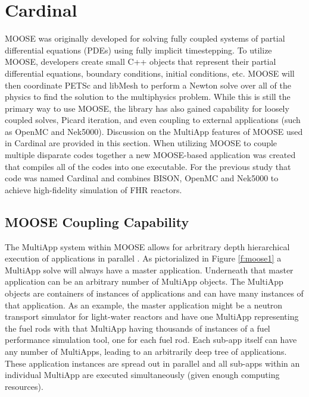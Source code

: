 \section{Cardinal}
\label{s:cardinal}

MOOSE was originally developed for solving fully coupled systems of partial differential equations (PDEs) using fully implicit timestepping. To utilize MOOSE, developers create small C++ objects that represent their partial differential equations, boundary conditions, initial conditions, etc. MOOSE will then coordinate PETSc and libMesh to perform a Newton solve over all of the physics to find the solution to the multiphysics problem. While this is still the primary way to use MOOSE, the library has also gained capability for loosely coupled solves, Picard iteration, and even coupling to external applications (such as OpenMC and Nek5000). Discussion on the MultiApp features of MOOSE used in Cardinal are provided in this section. When utilizing MOOSE to couple multiple disparate codes together a new MOOSE-based application was created \cite{cardinal}  that compiles all of the codes into one executable. For the previous study that code was  named Cardinal and combines BISON, OpenMC and Nek5000 to achieve high-fidelity simulation of FHR reactors.

\subsection{MOOSE Coupling Capability}

The MultiApp system within MOOSE allows for arbritrary depth hierarchical execution of applications in parallel \cite{gaston2015physics}. As pictorialized in Figure \ref{f:moose1} a MultiApp solve will always have a master application. Underneath that master application can be an arbitrary number of MultiApp objects. The MultiApp objects are containers of instances of applications and can have many instances of that application. As an example, the master application might be a neutron transport simulator for light-water reactors and have one MultiApp representing the fuel rods with that MultiApp having thousands of instances of a fuel performance simulation tool, one for each fuel rod. Each sub-app itself can have any number of MultiApps, leading to an arbitrarily deep tree of applications. These application instances are spread out in parallel and all sub-apps within an individual MultiApp are executed simultaneously (given enough computing resources).

